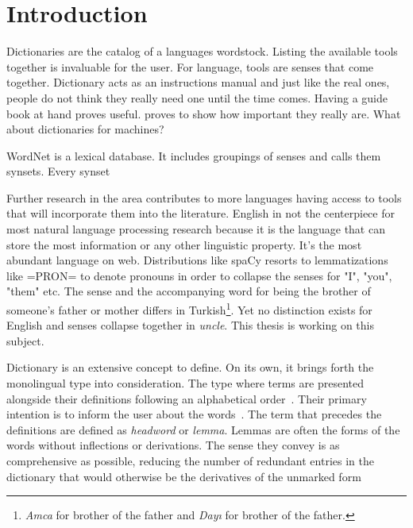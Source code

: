 \chapter{Introduction}\label{chap:introduction}%
Dictionaries are the catalog of a languages wordstock.
Listing the available tools together is invaluable for the user.
For language, tools are senses that come together.
Dictionary acts as an instructions manual and just like the real ones, people do not think they really need one until the time comes.
Having a guide book at hand proves useful.
proves to show how important they really are.
What about dictionaries for machines?

WordNet is a lexical database.
It includes groupings of senses and calls them synsets.
Every synset

Further research in the area contributes to more languages having access to tools that will incorporate them into the literature.
English in not the centerpiece for most natural language processing research because it is the language that can store the most information or any other linguistic property.
It's the most abundant language on web.
Distributions like spaCy resorts to lemmatizations like =PRON= to denote pronouns in order to collapse the senses for "I", "you", "them" etc\@.
The sense and the accompanying word for being the brother of someone's father or mother differs in Turkish\footnote{\emph{Amca} for brother of the father and \emph{Dayı} for brother of the father.}.
Yet no distinction exists for English and senses collapse together in \emph{uncle}.
This thesis is working on this subject.



Dictionary is an extensive concept to define.
On its own, it brings forth the monolingual type into consideration.
The type where terms are presented alongside their definitions following an alphabetical order~\cite{sterkenburg_practical_2003}.
Their primary intention is to inform the user about the words~\cite{uzun_modern_2005}.
The term that precedes the definitions are defined as \emph{headword} or \emph{lemma}.
Lemmas are often the forms of the words without inflections or derivations.
The sense they convey is as comprehensive as possible, reducing the number of redundant entries in the dictionary that would otherwise be the derivatives of the unmarked form~\cite{ibrahim_usta_turkce_2006}


